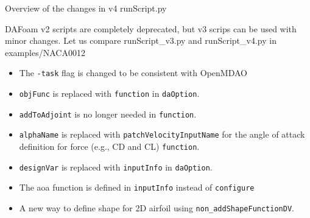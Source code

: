 \documentclass{bredelebeamer}
\begin{document}
\begin{frame}{Overview of the changes in v4 runScript.py}

\item DAFoam v2 scripts are completely deprecated, but v3 scrips can be used with minor changes. Let us compare runScript\_v3.py and runScript\_v4.py in examples/NACA0012

\begin{itemize}

  \item The \texttt{-task} flag is changed to be consistent with OpenMDAO
  \item \texttt{objFunc} is replaced with \texttt{function} in \texttt{daOption}.
  \item \texttt{addToAdjoint} is no longer needed in \texttt{function}.
  \item \texttt{alphaName} is replaced with \texttt{patchVelocityInputName} for the angle of attack definition for force (e.g., CD and CL) \texttt{function}.
  \item \texttt{designVar} is replaced with \texttt{inputInfo} in \texttt{daOption}.
  \item The aoa function is defined in \texttt{inputInfo} instead of \texttt{configure}
  \item A new way to define shape for 2D airfoil using \texttt{non\_addShapeFunctionDV}.
\end{itemize}

\end{frame}
\end{document}
